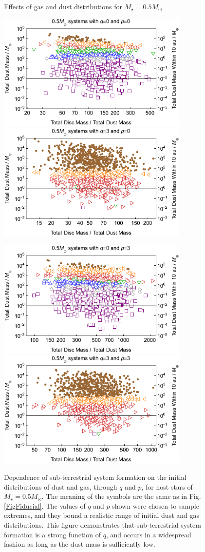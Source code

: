 \documentclass[useAMS,usenatbib]{mn2e}
\begin{document}
\begin{figure}
\centerline{\Huge \underline{Effects of gas and dust distributions for $M_{\star}=0.5M_{\odot}$}}
\centerline{}
\centerline{}
\centerline{
\includegraphics[width=9.5cm]{Plotm05q00p00}
\includegraphics[width=9.5cm]{Plotm05q30p00}
}
\centerline{}
\centerline{
\includegraphics[width=9.5cm]{Plotm05q00p30}
\includegraphics[width=9.5cm]{Plotm05q30p30}
}
\caption{
Dependence of sub-terrestrial system formation on the initial distributions of dust and gas, through $q$ and $p$, for host stars of $M_{\star}=0.5M_{\odot}$. The meaning of the symbols are the same as in Fig. \ref{FigFiducial}. The values of $q$ and $p$ shown were chosen to sample extremes, and they bound a realistic range of initial dust and gas distributions. This figure demonstrates that sub-terrestrial system formation is a strong function of $q$, and occurs in a widespread fashion as long as the dust mass is sufficiently low. 
}
\label{FigM05}
\end{figure}
\end{document}

